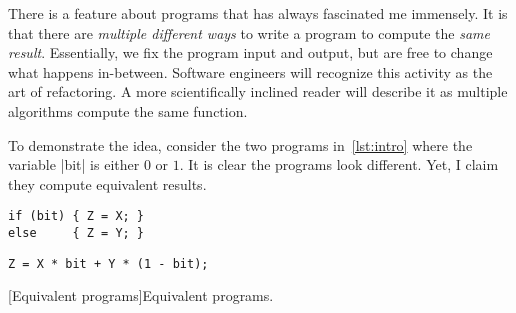 
There is a feature about programs that has always fascinated me immensely.
It is that there are \emph{multiple different ways} to write a program to compute the \emph{same result}.
Essentially, we fix the program input and output, but are free to change what happens in-between.
Software engineers will recognize this activity as the art of refactoring.
A more scientifically inclined reader will describe it as multiple algorithms compute the same function.

To demonstrate the idea, consider the two programs in~\autoref{lst:intro} where the variable \pr|bit| is either \(0\) or \(1\).
It is clear the programs look different.
Yet, I claim they compute equivalent results.

\begin{minipage}{\textwidth}
\begin{center}
\begin{minipage}{.3\textwidth}
\begin{lstlisting}[nolol,label={p1},frame=none,numbers=none,aboveskip=0pt,belowskip=0pt]
if (bit) { Z = X; }
else     { Z = Y; }
\end{lstlisting}
\end{minipage}\hspace{3em}%
\begin{minipage}{.4\textwidth}
\begin{lstlisting}[nolol,label={p2},frame=none,numbers=none,aboveskip=0pt,belowskip=0pt]
Z = X * bit + Y * (1 - bit);
\end{lstlisting}
\end{minipage}
\end{center}
[Equivalent programs]{Equivalent programs.}
\label{lst:intro}
\end{minipage}

